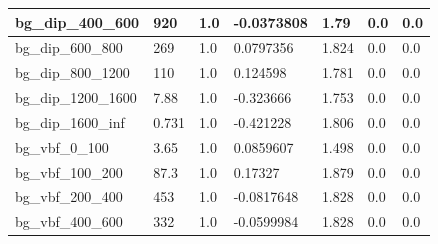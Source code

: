 \documentclass[a4paper, 10pt]{article}
\begin{document}
\begin{table}[H]
\begin{center}
\begin{tabular}{|m{23.0mm}|m{23.0mm}|m{18.0mm}|m{19.0mm}|m{19.0mm}|m{19.0mm}|m{19.0mm}|}
      \hline
      {\cellcolor{white}         bg\_dip\_400\_600}& {\cellcolor{white}         920}& {\cellcolor{white}         1.0}& {\cellcolor{white}         -0.0373808}& {\cellcolor{white}         1.79}& {\cellcolor{green}         0.0}& {\cellcolor{green}         0.0}\\
      \hline
      {\cellcolor{white}         bg\_dip\_600\_800}& {\cellcolor{white}         269}& {\cellcolor{white}         1.0}& {\cellcolor{white}         0.0797356}& {\cellcolor{white}         1.824}& {\cellcolor{green}         0.0}& {\cellcolor{green}         0.0}\\
      \hline
      {\cellcolor{white}         bg\_dip\_800\_1200}& {\cellcolor{white}         110}& {\cellcolor{white}         1.0}& {\cellcolor{white}         0.124598}& {\cellcolor{white}         1.781}& {\cellcolor{green}         0.0}& {\cellcolor{green}         0.0}\\
      \hline
      {\cellcolor{white}         bg\_dip\_1200\_1600}& {\cellcolor{white}         7.88}& {\cellcolor{white}         1.0}& {\cellcolor{white}         -0.323666}& {\cellcolor{white}         1.753}& {\cellcolor{green}         0.0}& {\cellcolor{green}         0.0}\\
      \hline
      {\cellcolor{white}         bg\_dip\_1600\_inf}& {\cellcolor{white}         0.731}& {\cellcolor{white}         1.0}& {\cellcolor{white}         -0.421228}& {\cellcolor{white}         1.806}& {\cellcolor{green}         0.0}& {\cellcolor{green}         0.0}\\
      \hline
      {\cellcolor{white}         bg\_vbf\_0\_100}& {\cellcolor{white}         3.65}& {\cellcolor{white}         1.0}& {\cellcolor{white}         0.0859607}& {\cellcolor{white}         1.498}& {\cellcolor{green}         0.0}& {\cellcolor{green}         0.0}\\
      \hline
      {\cellcolor{white}         bg\_vbf\_100\_200}& {\cellcolor{white}         87.3}& {\cellcolor{white}         1.0}& {\cellcolor{white}         0.17327}& {\cellcolor{white}         1.879}& {\cellcolor{green}         0.0}& {\cellcolor{green}         0.0}\\
      \hline
      {\cellcolor{white}         bg\_vbf\_200\_400}& {\cellcolor{white}         453}& {\cellcolor{white}         1.0}& {\cellcolor{white}         -0.0817648}& {\cellcolor{white}         1.828}& {\cellcolor{green}         0.0}& {\cellcolor{green}         0.0}\\
      \hline
      {\cellcolor{white}         bg\_vbf\_400\_600}& {\cellcolor{white}         332}& {\cellcolor{white}         1.0}& {\cellcolor{white}         -0.0599984}& {\cellcolor{white}         1.828}& {\cellcolor{green}         0.0}& {\cellcolor{green}         0.0}\\

\end{tabular}
\end{center}
\end{table}
\end{document}
